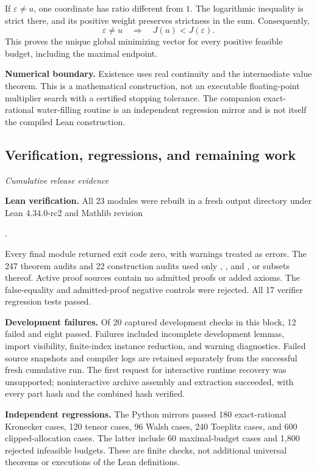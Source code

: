 If $\varepsilon\ne u$, one coordinate has ratio different from $1$. The logarithmic inequality is strict there, and its positive weight preserves strictness in the sum. Consequently,
\[
\boxed{\varepsilon\ne u\quad\Longrightarrow\quad J(u)<J(\varepsilon).}
\]
This proves the unique global minimizing vector for every positive feasible budget, including the maximal endpoint.

\textbf{Numerical boundary.} Existence uses real continuity and the intermediate value theorem. This is a mathematical construction, not an executable floating-point multiplier search with a certified stopping tolerance. The companion exact-rational water-filling routine is an independent regression mirror and is not itself the compiled Lean construction.



\subsection{Verification, regressions, and remaining work}\label{supp4:subsection:007}\textit{Cumulative release evidence}\par
\textbf{Lean verification.} All 23 modules were rebuilt in a fresh output directory under Lean 4.34.0-rc2 and Mathlib revision
\begin{center}.\end{center}
Every final module returned exit code zero, with warnings treated as errors. The 247 theorem audits and 22 construction audits used only , , and , or subsets thereof. Active proof sources contain no admitted proofs or added axioms. The false-equality and admitted-proof negative controls were rejected. All 17 verifier regression tests passed.

\textbf{Development failures.} Of 20 captured development checks in this block, 12 failed and eight passed. Failures included incomplete development lemmas, import visibility, finite-index instance reduction, and warning diagnostics. Failed source snapshots and compiler logs are retained separately from the successful fresh cumulative run. The first request for interactive runtime recovery was unsupported; noninteractive archive assembly and extraction succeeded, with every part hash and the combined hash verified.

\textbf{Independent regressions.} The Python mirrors passed 180 exact-rational Kronecker cases, 120 tensor cases, 96 Walsh cases, 240 Toeplitz cases, and 600 clipped-allocation cases. The latter include 60 maximal-budget cases and 1,800 rejected infeasible budgets. These are finite checks, not additional universal theorems or executions of the Lean definitions.


